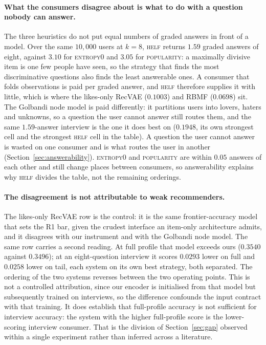 \documentclass[manuscript,screen,review]{acmart}
\begin{document}
\paragraph{What the consumers disagree about is what to do with a question nobody can answer.} The three heuristics do not put equal numbers of graded answers in front of a model. Over the same $10{,}000$ users at $k{=}8$, \textsc{helf} returns $1.59$ graded answers of eight, against $3.10$ for \textsc{entropy0} and $3.05$ for \textsc{popularity}: a maximally divisive item is one few people have seen, so the strategy that finds the most discriminative questions also finds the least answerable ones. A consumer that folds observations is paid per graded answer, and \textsc{helf} therefore supplies it with little, which is where the likes-only RecVAE ($0.1003$) and RBMF ($0.0698$) sit. The Golbandi node model is paid differently: it partitions users into lovers, haters and unknowns, so a question the user cannot answer still routes them, and the same $1.59$-answer interview is the one it does best on ($0.1948$, its own strongest cell and the strongest \textsc{helf} cell in the table). A question the user cannot answer is wasted on one consumer and is what routes the user in another (Section~\ref{sec:answerability}). \textsc{entropy0} and \textsc{popularity} are within $0.05$ answers of each other and still change places between consumers, so answerability explains why \textsc{helf} divides the table, not the remaining orderings.

\paragraph{The disagreement is not attributable to weak recommenders.} The likes-only RecVAE row is the control: it is the same frontier-accuracy model that sets the R1 bar, given the crudest interface an item-only architecture admits, and it disagrees with our instrument and with the Golbandi node model. The same row carries a second reading. At full profile that model exceeds ours ($0.3540$ against $0.3496$); at an eight-question interview it scores $0.0293$ lower on full and $0.0258$ lower on tail, each system on its own best strategy, both separated. The ordering of the two systems reverses between the two operating points. This is not a controlled attribution, since our encoder is initialised from that model but subsequently trained on interviews, so the difference confounds the input contract with that training. It does establish that full-profile accuracy is not sufficient for interview accuracy: the system with the higher full-profile score is the lower-scoring interview consumer. That is the division of Section~\ref{sec:gap} observed within a single experiment rather than inferred across a literature.
\end{document}
